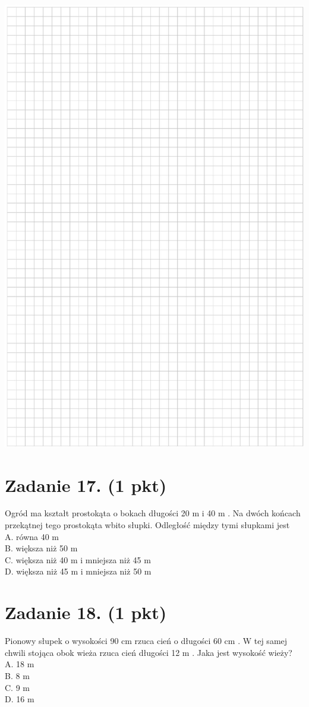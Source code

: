 \documentclass[10pt]{article}
\begin{document}
\includegraphics[max width=\textwidth, center]{2024_11_21_603d5c1b2a7d8d68f45fg-07}

\section*{Zadanie 17. (1 pkt)}
Ogród ma kształt prostokąta o bokach długości 20 m i 40 m . Na dwóch końcach przekątnej tego prostokąta wbito słupki. Odległość między tymi słupkami jest\\
A. równa 40 m\\
B. większa niż 50 m\\
C. większa niż 40 m i mniejsza niż 45 m\\
D. większa niż 45 m i mniejsza niż 50 m

\section*{Zadanie 18. (1 pkt)}
Pionowy słupek o wysokości 90 cm rzuca cień o długości 60 cm . W tej samej chwili stojąca obok wieża rzuca cień długości 12 m . Jaka jest wysokość wieży?\\
A. 18 m\\
B. 8 m\\
C. 9 m\\
D. 16 m
\end{document}
